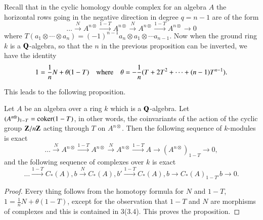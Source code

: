 Recall that in the cyclic homology double complex for an algebra $A$
the horizontal rows going in the negative direction in degree $q=n-1$
are of the form
$$
\ldots\xrightarrow{N}A^{n\otimes}\xrightarrow{1-T}A^{n\otimes}\xrightarrow{N}A^{n\otimes}\xrightarrow{1-T}A^{n\otimes}\to
0
$$
where $T(a_{1}\otimes\cdots\otimes a_{n})=(-1)^{n-1}a_{n}\otimes
a_{1}\otimes\cdots a_{n-1}$. Now when the ground ring $k$ is a
$\mathbf{Q}$-algebra, so that the $n$ in the previous proposition can be
inverted, we have the identity
$$
1=\frac{1}{n}N+\theta(1-T)\quad\text{where}\quad
\theta=-\frac{1}{n}(T+2T^{2}+\cdots+(n-1)T^{n-1}). 
$$

This leads to the following proposition.

\begin{proposition}\label{chap4-prop1.2}
Let $A$ be an algebra over a ring $k$ which is a $\mathbf{Q}$-algebra. Let
$(A^{n\otimes})_{1-T}=\operatorname{coker}(1-T)$, in other words, the coinvariants
of the action of the cyclic group $\mathbf{Z}/n\mathbf{Z}$ acting through $T$ on
$A^{n\otimes}$. Then the following sequence of $k$-modules is exact
$$
\ldots\xrightarrow{N}A^{n\otimes}\xrightarrow{1-T}A^{n\otimes}\xrightarrow{N}A^{n\otimes}\xrightarrow{1-T}A\to
(A^{n\otimes})_{1-T}\to 0,
$$
and the following sequence of complexes over $k$ is exact
$$
\ldots\xrightarrow{1-T}C_{\ast}(A),b\xrightarrow{N}C_{\ast}(A),b'\xrightarrow{1-T}C_{\ast}(A),b\to
C_{\ast}(A)_{1-T'}b\to 0.
$$
\end{proposition}

\begin{proof}
Every thing follows from the homotopy formula for $N$ and $1-T$,
$1=\frac{1}{n}N+\theta(1-T)$, except for the observation that $1-T$
and $N$ are morphisms of complexes and this is contained in
3(3.4). This proves the proposition.
\end{proof}

